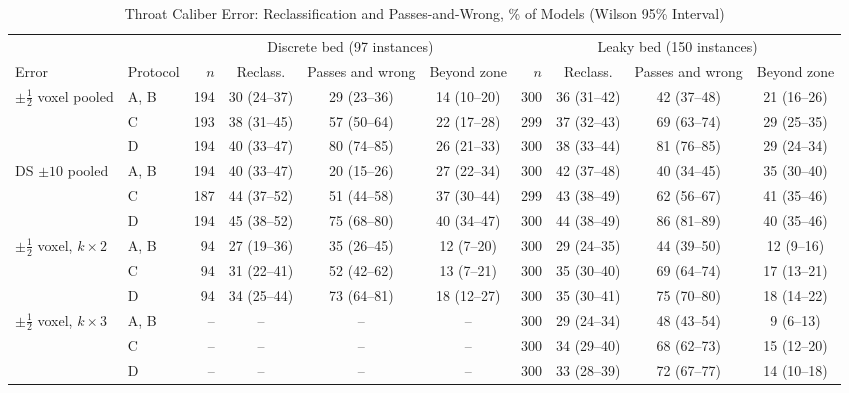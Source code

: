\documentclass[journal,twoside,web,onecolumn]{ieeecolor}
\begin{document}
\begin{table}[!ht]
\caption{Throat Caliber Error: Reclassification and Passes-and-Wrong, \% of Models (Wilson 95\% Interval)}\label{tab:throat}
\centering\footnotesize\setlength{\tabcolsep}{3pt}
\begin{tabular}{@{}llrccc rccc@{}}
\toprule
 & & \multicolumn{4}{c}{Discrete bed (97 instances)} & \multicolumn{4}{c}{Leaky bed (150 instances)}\\
\cmidrule(lr){3-6}\cmidrule(l){7-10}
Error & Protocol & $n$ & Reclass. & Passes and wrong & Beyond zone & $n$ & Reclass. & Passes and wrong & Beyond zone\\
\midrule
$\pm\tfrac12$ voxel pooled & A, B & 194 & 30 (24--37) & 29 (23--36) & 14 (10--20) & 300 & 36 (31--42) & 42 (37--48) & 21 (16--26) \\
 & C & 193 & 38 (31--45) & 57 (50--64) & 22 (17--28) & 299 & 37 (32--43) & 69 (63--74) & 29 (25--35) \\
 & D & 194 & 40 (33--47) & 80 (74--85) & 26 (21--33) & 300 & 38 (33--44) & 81 (76--85) & 29 (24--34) \\
\addlinespace[2pt]
DS $\pm10$ pooled & A, B & 194 & 40 (33--47) & 20 (15--26) & 27 (22--34) & 300 & 42 (37--48) & 40 (34--45) & 35 (30--40) \\
 & C & 187 & 44 (37--52) & 51 (44--58) & 37 (30--44) & 299 & 43 (38--49) & 62 (56--67) & 41 (35--46) \\
 & D & 194 & 45 (38--52) & 75 (68--80) & 40 (34--47) & 300 & 44 (38--49) & 86 (81--89) & 40 (35--46) \\
$\pm\tfrac12$ voxel, $k\times2$ & A, B & 94 & 27 (19--36) & 35 (26--45) & 12 (7--20) & 300 & 29 (24--35) & 44 (39--50) & 12 (9--16) \\
 & C & 94 & 31 (22--41) & 52 (42--62) & 13 (7--21) & 300 & 35 (30--40) & 69 (64--74) & 17 (13--21) \\
 & D & 94 & 34 (25--44) & 73 (64--81) & 18 (12--27) & 300 & 35 (30--41) & 75 (70--80) & 18 (14--22) \\
\addlinespace[2pt]
$\pm\tfrac12$ voxel, $k\times3$ & A, B & -- & -- & -- & -- & 300 & 29 (24--34) & 48 (43--54) & 9 (6--13) \\
 & C & -- & -- & -- & -- & 300 & 34 (29--40) & 68 (62--73) & 15 (12--20) \\
 & D & -- & -- & -- & -- & 300 & 33 (28--39) & 72 (67--77) & 14 (10--18) \\
\bottomrule
\end{tabular}
\\[3pt]

\end{table}
\end{document}
